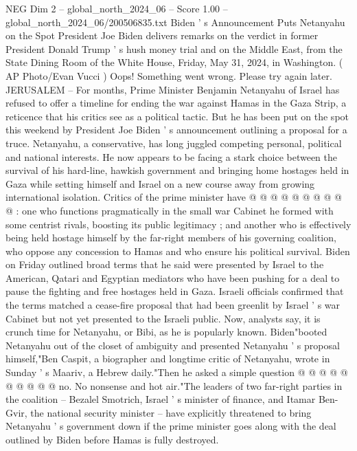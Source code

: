 \begin{textsample}{NEG Dim 2 – global\_north\_2024\_06 – Score 1.00 – global\_north\_2024\_06/200506835.txt}  \label{ex:f2_neg_195}
Biden ' s Announcement Puts Netanyahu on the Spot President Joe Biden delivers remarks on the verdict in former President Donald Trump ' s hush money trial and on the Middle East, from the State Dining Room of the White House, Friday, May 31, 2024, in Washington. ( AP Photo/Evan Vucci ) Oops!
Something went wrong.
Please try again later.
JERUSALEM -- For months, Prime Minister Benjamin Netanyahu of Israel has refused to offer a timeline for ending the war against Hamas in the Gaza Strip, a reticence that his critics see as a political tactic.
But he has been put on the spot this weekend by President Joe Biden ' s announcement outlining a proposal for a truce.
Netanyahu, a conservative, has long juggled competing personal, political and national interests.
He now appears to be facing a stark choice between the survival of his hard-line, hawkish government and bringing home hostages held in Gaza while setting himself and Israel on a new course away from growing international isolation.
Critics of the prime minister have @ @ @ @ @ @ @ @ @ @ : one who functions pragmatically in the small war Cabinet he formed with some centrist rivals, boosting its public legitimacy ; and another who is effectively being held hostage himself by the far-right members of his governing coalition, who oppose any concession to Hamas and who ensure his political survival.
Biden on Friday outlined broad terms that he said were presented by Israel to the American, Qatari and Egyptian mediators who have been pushing for a deal to pause the fighting and free hostages held in Gaza.
Israeli officials confirmed that the terms matched a cease-fire proposal that had been greenlit by Israel ' s war Cabinet but not yet presented to the Israeli public.
Now, analysts say, it is crunch time for Netanyahu, or Bibi, as he is popularly known.
Biden"booted Netanyahu out of the closet of ambiguity and presented Netanyahu ' s proposal himself,"Ben Caspit, a biographer and longtime critic of Netanyahu, wrote in Sunday ' s Maariv, a Hebrew daily."Then he asked a simple question @ @ @ @ @ @ @ @ @ @ no.
No nonsense and hot air."The leaders of two far-right parties in the coalition -- Bezalel Smotrich, Israel ' s minister of finance, and Itamar Ben-Gvir, the national security minister -- have explicitly threatened to bring Netanyahu ' s government down if the prime minister goes along with the deal outlined by Biden before Hamas is fully destroyed.

\end{textsample}
